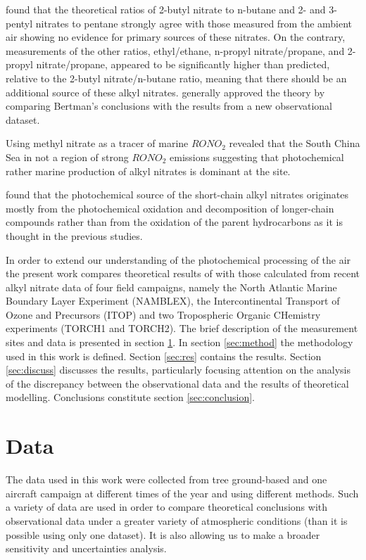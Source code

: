 \documentclass[11pt,a4paper]{article}
\begin{document}
\cite{Bertman1995} found that the theoretical ratios of  2-butyl nitrate to n-butane and 2- and 3-pentyl nitrates to pentane strongly agree with those measured from the ambient air showing no evidence for primary sources of these nitrates. On the contrary, measurements of the other ratios, ethyl/ethane, n-propyl nitrate/propane, and 2-propyl nitrate/propane, appeared to be significantly higher than predicted, relative to the 2-butyl nitrate/n-butane ratio, meaning that there should be an additional source of these alkyl nitrates. \cite{Roberts1998} generally approved the theory by comparing Bertman's conclusions with the results from a new observational dataset.

Using methyl nitrate as a tracer of marine $RONO_2$ \cite{Simpson2006} revealed that the South China Sea in not a region of strong $RONO_2$ emissions suggesting that photochemical rather marine production of alkyl nitrates is dominant at the site.

\cite{Worton2010} found that the photochemical source of the short-chain alkyl nitrates originates mostly from the photochemical oxidation and decomposition of longer-chain compounds rather than from the oxidation of the parent hydrocarbons as it is thought in the previous studies.

In order to extend our understanding of the photochemical processing of the air the present work compares theoretical results of \cite{Bertman1995} with those calculated from recent alkyl nitrate data of four field campaigns, namely the North Atlantic Marine Boundary Layer Experiment (NAMBLEX), the Intercontinental Transport of Ozone and Precursors (ITOP) and two Tropospheric Organic CHemistry experiments (TORCH1 and TORCH2). The brief description of the measurement sites and data is presented in section \ref{sec:data}. In section \ref{sec:method} the methodology used in this work is defined. Section \ref{sec:res} contains the results. Section \ref{sec:discuss} discusses the results, particularly focusing attention on the analysis of the discrepancy between the observational data and the results of theoretical modelling. Conclusions constitute section \ref{sec:conclusion}.

\section{Data} \label{sec:data}
The data used in this work were collected from tree ground-based and one aircraft campaign at different times of the year and using different methods. Such a variety of data are used in order to compare theoretical conclusions with observational data under a greater variety of atmospheric conditions (than it is possible using only one dataset). It is also allowing us to make a broader sensitivity and uncertainties analysis.
\end{document}
